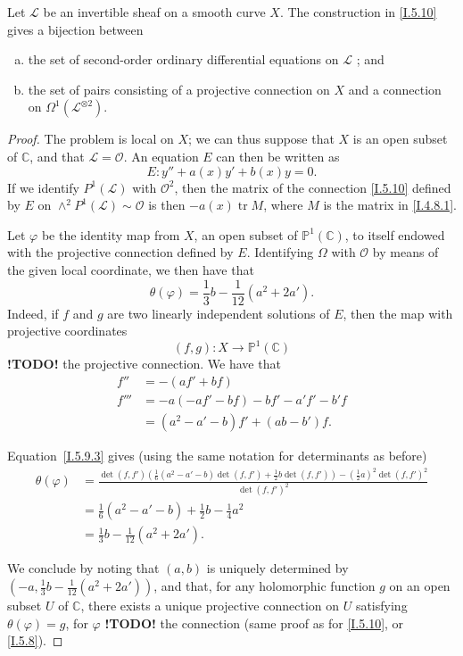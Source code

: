 \documentclass{report}
\theoremstyle{plain}
\newenvironment{proposition}[1]
    {\renewcommand\theinnercustomproposition{#1}\innercustomproposition}
    {\endinnercustomproposition}
\theoremstyle{definition}
\newcommand{\sh}[1]{{\mathscr{#1}}}
\newcommand{\PP}{\mathbb{P}}
\newcommand{\CC}{\mathbb{C}}
\newcommand{\detrow}[2]{\operatorname{det}(#1,#2)}
\DeclareMathOperator{\tr}{tr}
\newcommand{\todo}{\textbf{ !TODO! }}
\newcommand{\oldpage}[1]{\marginpar{\footnotesize$\Big\vert$ \textit{p.~#1}}}
\begin{document}
\begin{proposition}{5.12}
\label{I.5.12}
  Let $\sh{L}$ be an invertible sheaf on a smooth curve $X$.
  The construction in \cref{I.5.10} gives a bijection between
  \begin{enumerate}[a)]
    \item the set of second-order ordinary differential equations on $\sh{L}$ ; and
\oldpage{36}
    \item the set of pairs consisting of a projective connection on $X$ and a connection on $\Omega^1(\sh{L}^{\otimes2})$.
  \end{enumerate}
\end{proposition}

\begin{proof}
  The problem is local on $X$;
  we can thus suppose that $X$ is an open subset of $\CC$, and that $\sh{L}=\sh{O}$.
  An equation $E$ can then be written as
  \[
    E\colon y'' + a(x)y' + b(x)y = 0.
  \]
  If we identify $P^1(\sh{L})$ with $\sh{O}^2$, then the matrix of the connection \cref{I.5.10} defined by $E$ on $\wedge^2 P^1(\sh{L})\sim\sh{O}$ is then $-a(x)\tr M$, where $M$ is the matrix in \cref{I.4.8.1}.

  Let $\varphi$ be the identity map from $X$, an open subset of $\PP^1(\CC)$, to itself endowed with the projective connection defined by $E$.
  Identifying $\Omega$ with $\sh{O}$ by means of the given local coordinate, we then have that
  \[
  \label{I.5.12.1}
    \theta(\varphi) = \frac13b - \frac{1}{12}(a^2+2a').
  \tag{5.12.1}
  \]
  Indeed, if $f$ and $g$ are two linearly independent solutions of $E$, then the map with projective coordinates
  \[
    (f,g)\colon X\to\PP^1(\CC)
  \]
  \todo the projective connection.
  We have that
  \[
    \begin{aligned}
      f''
      &= -(af'+bf)
    \\f'''
      &= -a(-af'-bf) - bf' - a'f' - b'f
    \\&= (a^2-a'-b)f' + (ab-b')f.
    \end{aligned}
  \]

  Equation~\cref{I.5.9.3} gives (using the same notation for determinants as before)
  \[
    \begin{aligned}
      \theta(\varphi)
      &= \frac{
        \detrow{f}{f'}
        \left(
          \frac16(a^2-a'-b)\detrow{f}{f'}
          +\frac12 b\detrow{f}{f'}
        \right)
        - (\frac12a)^2\detrow{f}{f'}^2
      }{
        \detrow{f}{f'}^2
      }
    \\&= \frac16(a^2-a'-b) + \frac12 b - \frac14 a^2
    \\&= \frac13 b - \frac{1}{12}(a^2+2a').
    \end{aligned}
  \]

  We conclude by noting that $(a,b)$ is uniquely determined by $(-a,\frac13b-\frac{1}{12}(a^2+2a'))$, and that, for any holomorphic function $g$ on an open subset $U$ of $\CC$, there exists a unique projective connection on $U$ satisfying $\theta(\varphi)=g$, for $\varphi$ \todo the connection (same proof as for \cref{I.5.10}, or \cref{I.5.8}).
\end{proof}
\end{document}
